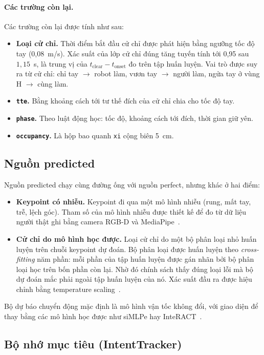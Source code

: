 \paragraph{Các trường còn lại.} Các trường còn lại được tính như sau:
\begin{itemize}
  \item \textbf{Loại cử chỉ.} Thời điểm bắt đầu cử chỉ được phát hiện bằng ngưỡng tốc độ tay (0,08~m/s). Xác suất của lớp cử chỉ đúng tăng tuyến tính tới 0,95 sau $1{,}15$~s, là trung vị của $t_\text{clear} - t_\text{onset}$ đo trên tập huấn luyện. Vai trò được suy ra từ cử chỉ: chỉ tay $\to$ robot làm, vươn tay $\to$ người làm, ngửa tay ở vùng H $\to$ cùng làm.
  \item \textbf{\texttt{tte}.} Bằng khoảng cách tới tư thế đích của cử chỉ chia cho tốc độ tay.
  \item \textbf{\texttt{phase}.} Theo luật động học: tốc độ, khoảng cách tới đích, thời gian giữ yên.
  \item \textbf{\texttt{occupancy}.} Là hộp bao quanh \texttt{xi} cộng biên 5~cm.
\end{itemize}

\subsection{Nguồn predicted}

Nguồn predicted chạy cùng đường ống với nguồn perfect, nhưng khác ở hai điểm:
\begin{itemize}
  \item \textbf{Keypoint có nhiễu.} Keypoint đi qua một mô hình nhiễu (rung, mất tay, trễ, lệch góc). Tham số của mô hình nhiễu được thiết kế để đo từ dữ liệu người thật ghi bằng camera RGB-D và MediaPipe~\cite{zhang2020mediapipe}.
  \item \textbf{Cử chỉ do mô hình học được.} Loại cử chỉ do một bộ phân loại nhỏ huấn luyện trên chuỗi keypoint dự đoán. Bộ phân loại được huấn luyện theo \emph{cross-fitting} năm phần: mỗi phần của tập huấn luyện được gán nhãn bởi bộ phân loại học trên bốn phần còn lại. Nhờ đó chính sách thấy đúng loại lỗi mà bộ dự đoán mắc phải ngoài tập huấn luyện của nó. Xác suất đầu ra được hiệu chỉnh bằng temperature scaling~\cite{guo2017calibration}.
\end{itemize}
Bộ dự báo chuyển động mặc định là mô hình vận tốc không đổi, với giao diện để thay bằng các mô hình học được như siMLPe hay InteRACT~\cite{guo2023simlpe,kedia2024interact}.

\subsection{Bộ nhớ mục tiêu (IntentTracker)}
\label{sec:tracker}

